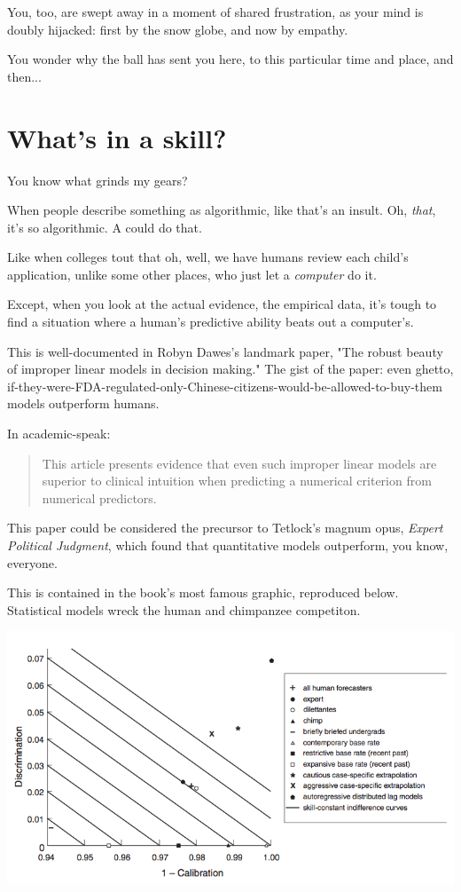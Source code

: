 You, too, are swept away in a moment of shared frustration, as your mind is
doubly hijacked: first by the snow globe, and now by empathy.

You wonder why the ball has sent you here, to this particular time and place,
and then...

\section{What's in a skill? }

You know what grinds my gears?

When people describe something as algorithmic, like that's an
insult. Oh, \textit{that}, it's so algorithmic. A  could do that.

Like when colleges tout that oh, well, we have humans review each child's
application, unlike some other places, who just let a \textit{computer} do
it.

Except, when you look at the actual evidence, the empirical data, it's tough to find a
situation where a human's predictive ability beats out a computer's.

This is well-documented in Robyn Dawes's landmark paper, "The robust beauty of
improper linear models in decision making." The gist of the paper: even ghetto,
if-they-were-FDA-regulated-only-Chinese-citizens-would-be-allowed-to-buy-them
models outperform humans.

In academic-speak:

\begin{quote}
This article presents evidence that even such improper linear models are
superior to clinical intuition when predicting a numerical criterion from
numerical predictors. 
\end{quote}

This paper could be considered the precursor to Tetlock's magnum opus, \textit{Expert
Political Judgment}, which found that quantitative models outperform, you know,
everyone.

This is contained in the book's most famous graphic, reproduced
below. Statistical models wreck the human and chimpanzee competiton.

\includegraphics[width=\textwidth]{graphics/expert-political-judgment}

